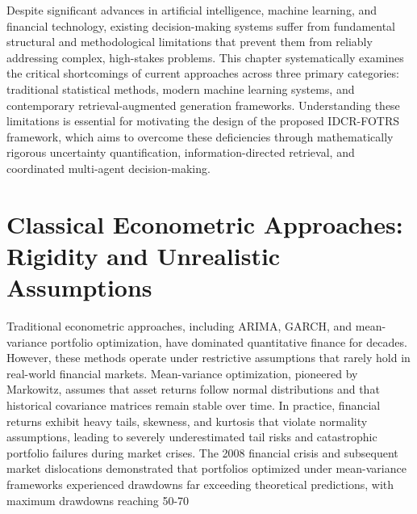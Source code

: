 \documentclass[12pt,a4paper,oneside]{report}
\theoremstyle{definition}
\theoremstyle{remark}
\begin{document}
Despite significant advances in artificial intelligence, machine learning, and financial technology, existing decision-making systems suffer from fundamental structural and methodological limitations that prevent them from reliably addressing complex, high-stakes problems. This chapter systematically examines the critical shortcomings of current approaches across three primary categories: traditional statistical methods, modern machine learning systems, and contemporary retrieval-augmented generation frameworks. Understanding these limitations is essential for motivating the design of the proposed IDCR-FOTRS framework, which aims to overcome these deficiencies through mathematically rigorous uncertainty quantification, information-directed retrieval, and coordinated multi-agent decision-making.

\section{Classical Econometric Approaches: Rigidity and Unrealistic Assumptions}

Traditional econometric approaches, including ARIMA, GARCH, and mean-variance portfolio optimization, have dominated quantitative finance for decades. However, these methods operate under restrictive assumptions that rarely hold in real-world financial markets. Mean-variance optimization, pioneered by Markowitz, assumes that asset returns follow normal distributions and that historical covariance matrices remain stable over time. In practice, financial returns exhibit heavy tails, skewness, and kurtosis that violate normality assumptions, leading to severely underestimated tail risks and catastrophic portfolio failures during market crises. The 2008 financial crisis and subsequent market dislocations demonstrated that portfolios optimized under mean-variance frameworks experienced drawdowns far exceeding theoretical predictions, with maximum drawdowns reaching 50-70%
\end{document}

